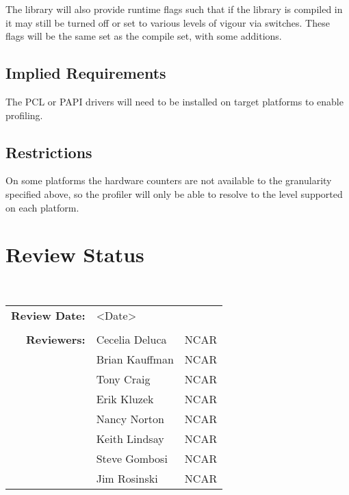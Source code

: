\documentclass[]{article}
\begin{document}
The library will also provide runtime flags such that if the library is
compiled in it may still be turned off or set to various levels of vigour via switches.  
These flags will be the same set as the compile set, with some additions.

\subsection{Implied Requirements}

The PCL or PAPI drivers will need to be installed on target platforms to enable profiling.

\subsection{Restrictions}

On some platforms the hardware counters are not available to the granularity specified
above, so the profiler will only be able to resolve to the level supported on each
platform.

\section{Review Status}

 \\

\begin{tabular}{r p{1.3in} p{2in}}
{\bf Review Date:} & <Date> \\ \\
{\bf Reviewers:}   & Cecelia Deluca     & NCAR \\
                   & Brian Kauffman     & NCAR \\
                   & Tony Craig         & NCAR \\
                   & Erik Kluzek        & NCAR \\
                   & Nancy Norton       & NCAR \\
                   & Keith Lindsay      & NCAR \\
                   & Steve Gombosi      & NCAR \\
                   & Jim Rosinski       & NCAR
\end{tabular}
%

 

\end{document}
